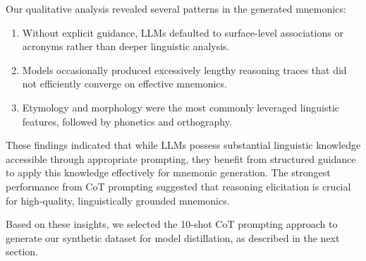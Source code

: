 Our qualitative analysis revealed several patterns in the generated mnemonics:

\begin{enumerate}
    \item Without explicit guidance, LLMs defaulted to surface-level associations or acronyms rather than deeper linguistic analysis.
    \item Models occasionally produced excessively lengthy reasoning traces that did not efficiently converge on effective mnemonics.
    \item Etymology and morphology were the most commonly leveraged linguistic features, followed by phonetics and orthography.
\end{enumerate}

These findings indicated that while LLMs possess substantial linguistic knowledge accessible through appropriate prompting, they benefit from structured guidance to apply this knowledge effectively for mnemonic generation. The strongest performance from CoT prompting suggested that reasoning elicitation is crucial for high-quality, linguistically grounded mnemonics.

Based on these insights, we selected the 10-shot CoT prompting approach to generate our synthetic dataset for model distillation, as described in the next section.

